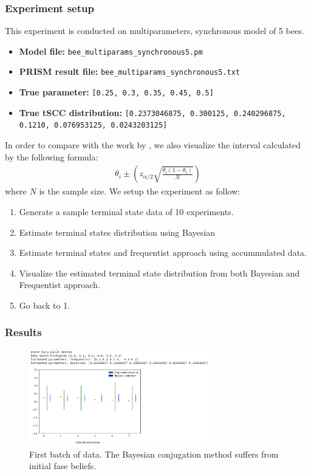 \documentclass[12pt]{article}
\theoremstyle{definition}
\begin{document}
\subsubsection{Experiment setup}
This experiment is conducted on multiparameters, synchronous model of 5 bees.
\begin{itemize}
\item \textbf{Model file:} \texttt{bee\_multiparams\_synchronous5.pm}
\item \textbf{PRISM result file:} \texttt{bee\_multiparams\_synchronous5.txt}
\item \textbf{True parameter:} \texttt{[0.25, 0.3, 0.35, 0.45, 0.5]}
\item \textbf{True tSCC distribution:} \texttt{[0.2373046875, 0.300125, 0.240296875, 0.1210, 0.076953125, 0.0243203125]}
\end{itemize}
In order to compare with the work by \cite{hajnal2019data}, we also visualize
the interval calculated by the following formula:
\begin{align*}
  \theta_i \pm (z_{\alpha / 2}\sqrt{\frac{\theta_i(1-\theta_i)}{N}})
\end{align*}
where $N$ is the sample size. We setup the experiment as follow:
\begin{enumerate}
\item Generate a sample terminal state data of 10 experiments.
\item Estimate terminal states distribution using Bayesian
\item Estimate terminal states and frequentist approach using accummulated data.
\item Visualize the estimated terminal state distribution from both Bayesian and
  Frequentist approach.
\item Go back to 1.
\end{enumerate}

\subsubsection{Results}
\begin{figure}[H]
  \centering
  \includegraphics[width=0.7\textwidth,keepaspectratio]{figures/ex1_1.png}
  \caption{First batch of data. The Bayesian conjugation method suffers from
    initial fase beliefs.}
\end{figure}
\end{document}
